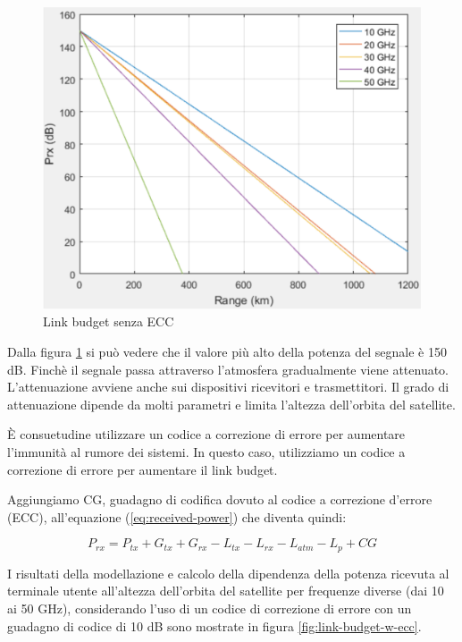 \begin{figure}[htbp]
  \centering
  \includegraphics[width=0.8\linewidth]{./res/img/link_budget_wo_ecc.png}
  \caption{Link budget senza \ac{ECC}}
  \label{fig:link-budget-wo-ecc}
\end{figure}

Dalla figura \ref{fig:link-budget-wo-ecc} si può vedere che il valore più alto della potenza del segnale è 150 dB.
Finchè il segnale passa attraverso l'atmosfera gradualmente viene attenuato.
L'attenuazione avviene anche sui dispositivi ricevitori e trasmettitori.
Il grado di attenuazione dipende da molti parametri e limita l'altezza dell'orbita del satellite.

È consuetudine utilizzare un codice a correzione di errore per aumentare l'immunità al rumore dei sistemi.
In questo caso, utilizziamo un codice a correzione di errore per aumentare il link budget.

Aggiungiamo CG, guadagno di codifica dovuto al codice a correzione d'errore (\ac{ECC}), all'equazione (\ref{eq:received-power}) che diventa quindi:

\begin{equation}
  P_{rx} = P_{tx} + G_{tx} + G_{rx} - L_{tx} - L_{rx} - L_{atm} - L_{p} + CG
\end{equation}

I risultati della modellazione e calcolo della dipendenza della potenza ricevuta al terminale utente all'altezza dell'orbita del satellite per frequenze diverse (dai 10 ai 50 GHz), considerando l'uso di un codice di correzione di errore con un guadagno di codice di 10 dB sono mostrate in figura \ref{fig:link-budget-w-ecc}.

